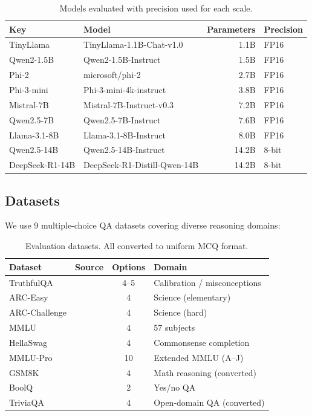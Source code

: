 \documentclass[11pt,a4paper]{article}
\begin{document}
\begin{table}[H]
\centering
\caption{Models evaluated with precision used for each scale.}
\label{tab:models}
\begin{tabular}{@{}llrl@{}}
\toprule
Key & Model & Parameters & Precision \\
\midrule
TinyLlama    & TinyLlama-1.1B-Chat-v1.0           & 1.1B  & FP16 \\
Qwen2-1.5B   & Qwen2-1.5B-Instruct                & 1.5B  & FP16 \\
Phi-2        & microsoft/phi-2                     & 2.7B  & FP16 \\
Phi-3-mini   & Phi-3-mini-4k-instruct              & 3.8B  & FP16 \\
Mistral-7B   & Mistral-7B-Instruct-v0.3            & 7.2B  & FP16 \\
Qwen2.5-7B   & Qwen2.5-7B-Instruct                & 7.6B  & FP16 \\
Llama-3.1-8B & Llama-3.1-8B-Instruct              & 8.0B  & FP16 \\
Qwen2.5-14B  & Qwen2.5-14B-Instruct               & 14.2B & 8-bit \\
DeepSeek-R1-14B & DeepSeek-R1-Distill-Qwen-14B     & 14.2B & 8-bit \\
\bottomrule
\end{tabular}
\end{table}

\subsection{Datasets}

We use 9 multiple-choice QA datasets covering diverse reasoning domains:

\begin{table}[H]
\centering
\caption{Evaluation datasets.  All converted to uniform MCQ format.}
\label{tab:datasets}
\begin{tabular}{@{}llcl@{}}
\toprule
Dataset & Source & Options & Domain \\
\midrule
TruthfulQA      & \cite{lin2022truthfulqa}   & 4--5 & Calibration / misconceptions \\
ARC-Easy        & \cite{clark2018arc}        & 4    & Science (elementary) \\
ARC-Challenge   & \cite{clark2018arc}        & 4    & Science (hard) \\
MMLU            & \cite{hendrycks2021mmlu}   & 4    & 57 subjects \\
HellaSwag       & \cite{zellers2019hellaswag}& 4    & Commonsense completion \\
MMLU-Pro        & \cite{wang2024mmlu}        & 10   & Extended MMLU (A--J) \\
GSM8K           & \cite{cobbe2021gsm8k}      & 4    & Math reasoning (converted) \\
BoolQ           & \cite{clark2019boolq}      & 2    & Yes/no QA \\
TriviaQA        & \cite{joshi2017triviaqa}   & 4    & Open-domain QA (converted) \\
\bottomrule
\end{tabular}
\end{table}
\end{document}
